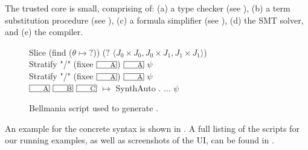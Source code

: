 The trusted core is small, comprising of: (a) a type checker (see ), 
(b) a term substitution procedure (see ),
(c) a formula simplifier (see ),
(d) the SMT solver, and
(e) the compiler.

\begin{figure}
\begin{transcript}
Slice (find ($\theta \mapsto {?}$)) ($?$ $\langle J_0\times J_0, J_0\times J_1, J_1\times J_1\rangle$)\\
Stratify "/" (fixee $\lbox A$) $\lbox A$ $\psi$ \\
Stratify "/" (fixee $\lbox A$) $\lbox A$ $\psi$ \\
$\lbox A$ $\lbox B$ $\lbox C$ $\mapsto$ SynthAuto . ... $\psi$
\end{transcript}
\caption{\label{overview:script}
  Bellmania script used to generate .}
\end{figure}

An example for the concrete syntax is shown in .
A full listing of the scripts for our running examples,
as well as screenshots of the UI, can be found
in .